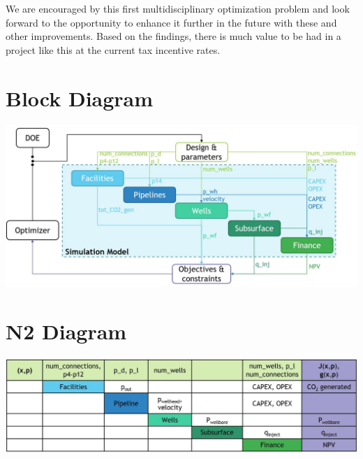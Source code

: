 \documentclass[balance,upint,subscriptcorrection,varvw,mathalfa=cal=boondoxo,spanish,french,vietnamese,russian,greek,pdf-a,colorlinks]{asmeconf}
\begin{document}
We are encouraged by this first multidisciplinary optimization problem and look forward to the opportunity to enhance it further in the future with these and other improvements. Based on the findings, there is much value to be had in a project like this at the current tax incentive rates.



\clearpage
\appendix

\section[Appendix A]{Block Diagram}\label{appendix:a}

\begin{center}
    \includegraphics[width=2\linewidth]{images/Block_diagram.jpg}
\end{center}
 \clearpage
\section[Appendix B]{N2 Diagram}\label{appendix:a}
\begin{center}
    \includegraphics[width=2\linewidth]{images/n2_diagram.jpg}
\end{center}
\end{document}
